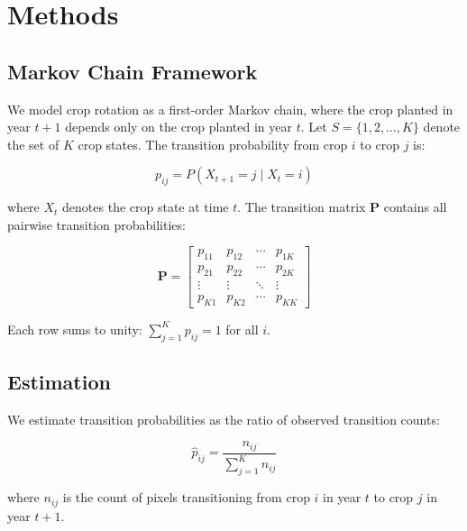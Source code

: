 \documentclass[12pt, a4paper]{article}
\begin{document}

\section{Methods}
\label{sec:methods}

\subsection{Markov Chain Framework}

We model crop rotation as a first-order Markov chain, where the crop planted in year $t+1$ depends only on the crop planted in year $t$. Let $S = \{1, 2, \ldots, K\}$ denote the set of $K$ crop states. The transition probability from crop $i$ to crop $j$ is:

\begin{equation}
p_{ij} = P(X_{t+1} = j \mid X_t = i)
\end{equation}

where $X_t$ denotes the crop state at time $t$. The transition matrix $\mathbf{P}$ contains all pairwise transition probabilities:

\begin{equation}
\mathbf{P} = \begin{bmatrix}
p_{11} & p_{12} & \cdots & p_{1K} \\
p_{21} & p_{22} & \cdots & p_{2K} \\
\vdots & \vdots & \ddots & \vdots \\
p_{K1} & p_{K2} & \cdots & p_{KK}
\end{bmatrix}
\end{equation}

Each row sums to unity: $\sum_{j=1}^{K} p_{ij} = 1$ for all $i$.

\subsection{Estimation}

We estimate transition probabilities as the ratio of observed transition counts:

\begin{equation}
\hat{p}_{ij} = \frac{n_{ij}}{\sum_{j=1}^{K} n_{ij}}
\end{equation}

where $n_{ij}$ is the count of pixels transitioning from crop $i$ in year $t$ to crop $j$ in year $t+1$.
\end{document}
